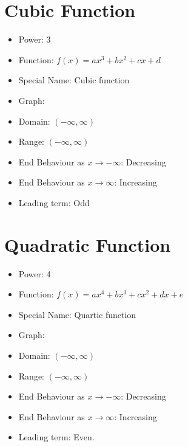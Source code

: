 \documentclass{article}
\begin{document}
\section*{Cubic Function}

\begin{itemize}
    \item Power: 3
    \item Function: $f(x) = ax^3 + bx^2 + cx + d$
    \item Special Name: Cubic function
    \item Graph:
    
    
    \item Domain: $(-\infty, \infty)$
    \item Range: $(-\infty, \infty)$
    \item End Behaviour as $x \rightarrow -\infty$: Decreasing
    \item End Behaviour as $x \rightarrow \infty$: Increasing
    \item Leading term: Odd
\end{itemize}
\newpage 


\section*{Quadratic Function}

\begin{itemize}
    \item Power: 4
    \item Function: $f(x) = ax^4 + bx^3 + cx^2 + dx + e$
    \item Special Name: Quartic function
    \item Graph:
    
    
    \item Domain: $(-\infty, \infty)$
    \item Range: $(-\infty, \infty)$
    \item End Behaviour as $x \rightarrow -\infty$: Decreasing
    \item End Behaviour as $x \rightarrow \infty$: Increasing
    \item Leading term: Even.
\end{itemize}
\newpage 
\end{document}
